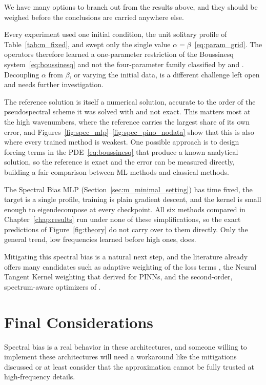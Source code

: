We have many options to branch out from the results above, and they should be weighed before the conclusions are carried anywhere else.

Every experiment used one initial condition, the unit solitary profile of Table~\ref{tab:m_fixed}, and swept only the single value $\alpha=\beta$~\eqref{eq:param_grid}. The operators therefore learned a one-parameter restriction of the Boussinesq system~\eqref{eq:boussinesq} and not the four-parameter family classified by \textcite{bona2002} and \textcite{martins2023}. Decoupling $\alpha$ from $\beta$, or varying the initial data, is a different challenge left open and needs further investigation.

The reference solution is itself a numerical solution, accurate to the order of the pseudospectral scheme it was solved with and not exact. This matters most at the high wavenumbers, where the reference carries the largest share of its own error, and Figures~\ref{fig:spec_mlp}--\ref{fig:spec_pino_nodata} show that this is also where every trained method is weakest. One possible approach is to design forcing terms in the PDE~\eqref{eq:boussinesq} that produce a known analytical solution, so the reference is exact and the error can be measured directly, building a fair comparison between ML methods and classical methods.

The Spectral Bias MLP (Section~\ref{sec:m_minimal_setting}) has time fixed, the target is a single profile, training is plain gradient descent, and the kernel is small enough to eigendecompose at every checkpoint. All six methods compared in Chapter~\ref{chap:results} run under none of these simplifications, so the exact predictions of Figure~\ref{fig:theory} do not carry over to them directly. Only the general trend, low frequencies learned before high ones, does.

Mitigating this spectral bias is a natural next step, and the literature already offers many candidates such as adaptive weighting of the loss terms \parencite{wang2021understanding}, the Neural Tangent Kernel weighting that \textcite{wang2022ntk} derived for PINNs, and the second-order, spectrum-aware optimizers of \textcite{khodakarami2026}.

\section{Final Considerations}
\label{sec:final_consid}

Spectral bias is a real behavior in these architectures, and someone willing to implement these architectures will need a workaround like the mitigations discussed or at least consider that the approximation cannot be fully trusted at high-frequency details.

